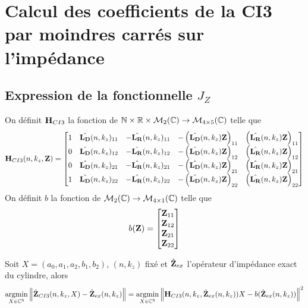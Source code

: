 \section{Calcul des coefficients de la CI3 par moindres carrés sur l'impédance}

  \subsection[Expression de la fonctionnelle JZ]{Expression de la fonctionnelle \(J_Z\)}

    \begin{defn}
      On définit \(\mathbf{H}_{CI3}\) la fonction de \(\mathbb N \times \mathbb R \times \mathcal{M}_2(\mathbb C) \rightarrow \mathcal{M}_{4\times5}(\mathbb C)\) telle que
      \begin{equation*}
        \mathbf{H}_{CI3}(n,k_z,\mathbf{Z}) = \begin{bmatrix}
        1 & \hat{\mathbf{L_D}}(n,k_z)_{11} & -\hat{\mathbf{L_R}}(n,k_z)_{11} & -\left(\hat{\mathbf{L_D}}(n,k_z){\mathbf{Z}}\right)_{11} & \left(\hat{\mathbf{L_R}}(n,k_z){\mathbf{Z}}\right)_{11}
        \\
        0 & \hat{\mathbf{L_D}}(n,k_z)_{12} & -\hat{\mathbf{L_R}}(n,k_z)_{12} & -\left(\hat{\mathbf{L_D}}(n,k_z){\mathbf{Z}}\right)_{12} & \left(\hat{\mathbf{L_R}}(n,k_z){\mathbf{Z}}\right)_{12}
        \\
        0 & \hat{\mathbf{L_D}}(n,k_z)_{21} & -\hat{\mathbf{L_R}}(n,k_z)_{21} & -\left(\hat{\mathbf{L_D}}(n,k_z){\mathbf{Z}}\right)_{21} & \left(\hat{\mathbf{L_R}}(n,k_z){\mathbf{Z}}\right)_{21}
        \\
        1 & \hat{\mathbf{L_D}}(n,k_z)_{22} & -\hat{\mathbf{L_R}}(n,k_z)_{22} & -\left(\hat{\mathbf{L_D}}(n,k_z){\mathbf{Z}}\right)_{22} & \left(\hat{\mathbf{L_R}}(n,k_z){\mathbf{Z}}\right)_{22}
        \end{bmatrix}
      \end{equation*}
      On définit \(b\) la fonction de \(\mathcal{M}_2(\mathbb C) \rightarrow \mathcal{M}_{4\times1}(\mathbb C)\) telle que
      \begin{equation*}
        b(\mathbf{Z}) = \begin{bmatrix}
        {\mathbf{Z}}_{11}
        \\
        {\mathbf{Z}}_{12}
        \\
        {\mathbf{Z}}_{21}
        \\
        {\mathbf{Z}}_{22}
        \end{bmatrix}
      \end{equation*}
    \end{defn}

    \begin{prop}
      Soit \(X = (a_0,a_1,a_2,b_1,b_2)\), \((n,k_z)\) fixé et \(\hat{\mathbf{Z}}_{ex}\) l'opérateur d'impédance exact du cylindre, alors
      \begin{equation*}
        {\underset{X\in\mathbb C^5}{\operatorname{argmin}}} \left\lVert\hat{\mathbf{Z}}_{CI3}(n,k_z,X) - \hat{\mathbf{Z}}_{ex}(n,k_z)\right\rVert = {\underset{X\in\mathbb C^5}{\operatorname{argmin}}} \left\lVert\mathbf{H}_{CI3}(n,k_z,\hat{\mathbf{Z}}_{ex}(n,k_z))X - b(\hat{\mathbf{Z}}_{ex}(n,k_z))\right\rVert^2
      \end{equation*}
    \end{prop}

